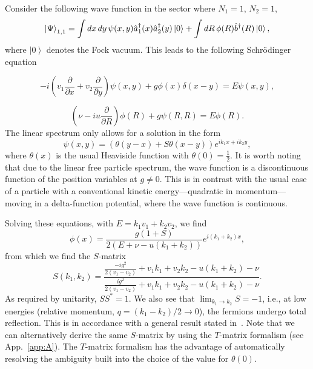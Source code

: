 \documentclass[aps,pra,
superscriptaddress,
reprint,twocolumn,preprintnumbers,
amsmath,amssymb,
nofootinbib]{revtex4-1}
\begin{document}
Consider the following wave function in the sector where $N_1=1$, $N_2=1$,
	\begin{equation} \label{eq:ne2}
	\ket{\Psi}_{1,1} = \int dx\,dy\, \psi(x,y)  \hat{a}^{\dagger}_{1}(x) \hat{a}^{\dagger}_{2}(y)\ket{0} + \int dR\, \phi(R) \hat{b}^{\dagger}(R) \ket{0},
	\end{equation} where $\left| 0 \right>$ denotes the Fock vacuum.
This leads to the following Schr\"odinger equation

	\begin{equation}
	- i \left( v_1 \frac{\partial}{\partial x} + v_2 \frac{\partial}{\partial y} \right) \psi(x,y) + g \phi(x) \delta{(x-y)} = E \psi (x,y),
	\end{equation}
	
	\begin{equation}
	\left(\nu - i u \frac{\partial}{\partial R}\right) \phi(R) + g \psi(R,R) = E \phi(R).
	\end{equation}
	The linear spectrum only allows for a solution in the form
	\begin{equation}
	\psi(x,y) = (\theta{(y-x)} + S \theta{(x-y)}) e^{i k_1 x + i k_2 y} ,
	\end{equation}
where $\theta(x)$ is the usual Heaviside function with $\theta(0) = \frac{1}{2}$. It is worth noting that due to the linear free particle spectrum, the wave function is a discontinuous
function of the position variables at $g\neq 0$. This is in contrast with the usual case of a particle with a conventional kinetic energy---quadratic in momentum---moving in a delta-function potential, where the wave function is continuous. 

Solving these equations, with $E = k_1 v_1 + k_2 v_2$, we find
	\begin{equation}
	\label{eqn:10}
	\phi(x) = \frac{g (1 + S)}{2 (E + \nu - u(k_1 + k_2))}  e^{i (k_1 + k_2) x} ,
	\end{equation}
from which we find the $S$-matrix
	\begin{equation}
	\label{eqn:11}
	S(k_1,k_2) =  \frac{\frac{-i g^2}{2(v_1 - v_2)} + v_1 k_1 + v_2 k_2 - u (k_1 + k_2) - \nu}{\frac{i g^2}{2(v_1 - v_2)} + v_1 k_1 + v_2 k_2 - u (k_1 + k_2)-\nu} .
	\end{equation}
As required by unitarity, $S S^{*} = 1$. We also see that $\lim_{k_1\to k_2} S = -1$, i.e., at low energies (relative momentum, $q = (k_1 - k_2)/2 \to 0$), the fermions undergo total reflection. This is in accordance with a general result stated in~\cite{Gurarie2006}. Note that we can alternatively derive the same $S$-matrix by using the $T$-matrix formalism (see App.~\ref{app:A}). The $T$-matrix formalism has the advantage of automatically resolving the ambiguity built into the choice of the value for $\theta(0)$. 
\end{document}
